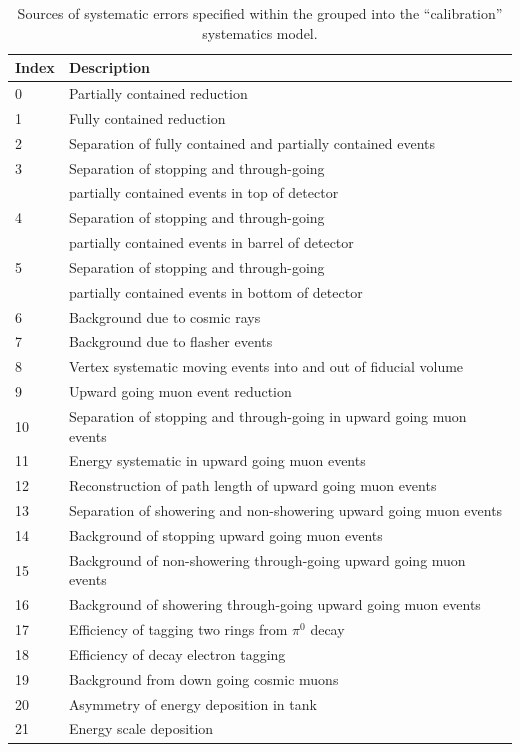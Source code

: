 \begin{table}[ht!]
  \centering
  \caption{Sources of systematic errors specified within the grouped into the ``calibration'' systematics model.}
  \label{SelsAndSysts_Systs_ATMPDCalibSysts}
		
  \begin{tabular}{ll} 
    
    \hline Index & Description \\ 
    \hline
    0 & Partially contained reduction  \\
    1 & Fully contained reduction \\
    2 & Separation of fully contained and partially contained events \\
    3 & Separation of stopping and through-going\\
      & \hspace{0.4cm} partially contained events in top of detector \\
    4 & Separation of stopping and through-going\\
      & \hspace{0.4cm} partially contained events in barrel of detector \\
    5 & Separation of stopping and through-going\\
      & \hspace{0.4cm} partially contained events in bottom of detector \\
    6 & Background due to cosmic rays \\
    7 & Background due to flasher events \\
    8 & Vertex systematic moving events into and out of fiducial volume \\
    9 & Upward going muon event reduction \\
    10 & Separation of stopping and through-going in upward going muon events \\
    11 & Energy systematic in upward going muon events \\
    12 & Reconstruction of path length of upward going muon events \\
    13 & Separation of showering and non-showering upward going muon events \\
    14 & Background of stopping upward going muon events \\
    15 & Background of non-showering through-going upward going muon events \\
    16 & Background of showering through-going upward going muon events \\
    17 & Efficiency of tagging two rings from $\pi^0$ decay \\
    18 & Efficiency of decay electron tagging \\
    19 & Background from down going cosmic muons \\
    20 & Asymmetry of energy deposition in tank \\
    21 & Energy scale deposition \\
    \hline
  \end{tabular}
\end{table}

